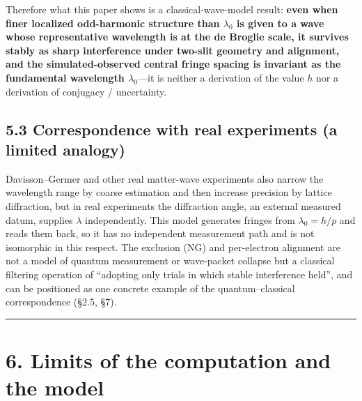 \documentclass[11pt,a4paper]{article}
\begin{document}
Therefore what this paper shows is a classical-wave-model result:
\textbf{even when finer localized odd-harmonic structure than
\(\lambda_0\) is given to a wave whose representative wavelength is at
the de Broglie scale, it survives stably as sharp interference under
two-slit geometry and alignment, and the simulated-observed central
fringe spacing is invariant as the fundamental wavelength
\(\lambda_0\)}---it is neither a derivation of the value \(h\) nor a
derivation of conjugacy / uncertainty.

\subsection{5.3 Correspondence with real experiments (a limited
analogy)}\label{correspondence-with-real-experiments-a-limited-analogy}

Davisson--Germer and other real matter-wave experiments also narrow the
wavelength range by coarse estimation and then increase precision by
lattice diffraction, but in real experiments the diffraction angle, an
external measured datum, supplies \(\lambda\) independently. This model
generates fringes from \(\lambda_0=h/p\) and reads them back, so it has
no independent measurement path and is not isomorphic in this respect.
The exclusion (NG) and per-electron alignment are not a model of quantum
measurement or wave-packet collapse but a classical filtering operation
of ``adopting only trials in which stable interference held'', and can
be positioned as one concrete example of the quantum--classical
correspondence (§2.5, §7).

\begin{center}\rule{0.5\linewidth}{0.5pt}\end{center}

\section{6. Limits of the computation and the
model}\label{limits-of-the-computation-and-the-model}
\end{document}
